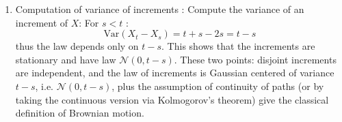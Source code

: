 \begin{parts}
\begin{xsolution}
\begin{enumerate}
       Using property ($iii'$)
       Compute $\text{Cov}(X_t - X_s, X_v - X_u)$
       for \(s < t \leq u < v\).
       \[
       \text{Cov}(X_t - X_s, X_v - X_u) = \min(t,v) - \min(t,u) - \min(s,v) + \min(s,u)
       \]
       This always gives 0, proving that 
       disjoint increments are uncorrelated, hence independent 
       (since Gaussian vector).
    \item Computation of variance of increments :  
       Compute the variance of an increment of $X$:
       For \(s < t\) :
       \[
       \text{Var}(X_t - X_s) = t + s - 2s = t - s
       \]
       thus the law depends only on \(t-s\).
       This shows that the increments are stationary 
       and have law \(\mathcal{N}(0, t-s)\).
    These two points:
    disjoint increments are independent, and
    the law of increments is Gaussian centered of variance $t-s$, i.e. \(\mathcal{N}(0, t-s)\),
    plus the assumption of continuity of paths 
    (or by taking the continuous version via Kolmogorov's theorem) give 
    the classical definition of Brownian motion.
    \end{enumerate}
    \end{xsolution}


\end{parts}
